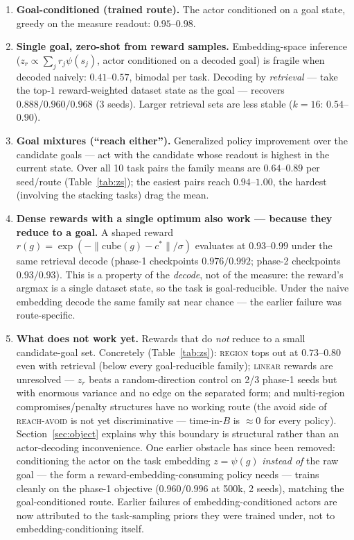 \documentclass[10pt]{article}
\begin{document}
\begin{enumerate}
  \item \textbf{Goal-conditioned (trained route).}
  The actor conditioned on a goal state, greedy on the measure readout: $0.95$--$0.98$.

  \item \textbf{Single goal, zero-shot from reward samples.}
  Embedding-space inference ($z_r \propto \sum_j r_j \psi(s_j)$, actor conditioned on a decoded goal) is fragile when decoded naively: $0.41$--$0.57$, bimodal per task.
  Decoding by \emph{retrieval} --- take the top-$1$ reward-weighted dataset state as the goal --- recovers $0.888 / 0.960 / 0.968$ (3 seeds).
  Larger retrieval sets are less stable ($k{=}16$: $0.54$--$0.90$).

  \item \textbf{Goal mixtures (``reach either'').}
  Generalized policy improvement \citep{barreto2017successor} over the candidate goals --- act with the candidate whose readout is highest in the current state.
  Over all 10 task pairs the family means are $0.64$--$0.89$ per seed/route
  (Table~\ref{tab:zs}); the easiest pairs reach $0.94$--$1.00$, the hardest
  (involving the stacking tasks) drag the mean.

  \item \textbf{Dense rewards with a single optimum also work --- because they reduce to a
  goal.} A shaped reward $r(g)=\exp(-\|\mathrm{cube}(g)-c^{*}\|/\sigma)$ evaluates at
  $0.93$--$0.99$ under the same retrieval decode (phase-1 checkpoints $0.976/0.992$;
  phase-2 checkpoints $0.93/0.93$).
  This is a property of the \emph{decode}, not of the measure: the reward's argmax is a
  single dataset state, so the task is goal-reducible.
  Under the naive embedding decode the same family sat near chance --- the earlier failure
  was route-specific.

  \item \textbf{What does not work yet.}
  Rewards that do \emph{not} reduce to a small candidate-goal set.
  Concretely (Table~\ref{tab:zs}): \textsc{region} tops out at $0.73$--$0.80$ even
  with retrieval (below every goal-reducible family); \textsc{linear} rewards are
  unresolved --- $z_r$ beats a random-direction control on 2/3 phase-1 seeds but with
  enormous variance and no edge on the separated form; and multi-region
  compromises/penalty structures have no working route (the avoid side of
  \textsc{reach-avoid} is not yet discriminative --- time-in-$B$ is $\approx 0$ for
  every policy).
  Section~\ref{sec:object} explains why this boundary is structural rather than an
  actor-decoding inconvenience.
  One earlier obstacle has since been removed: conditioning the actor on the task
  embedding $z=\psi(g)$ \emph{instead of} the raw goal --- the form a
  reward-embedding-consuming policy needs --- trains cleanly on the phase-1 objective
  ($0.960/0.996$ at 500k, 2 seeds), matching the goal-conditioned route.
  Earlier failures of embedding-conditioned actors are now attributed to the task-sampling
  priors they were trained under, not to embedding-conditioning itself.
\end{enumerate}
\end{document}

